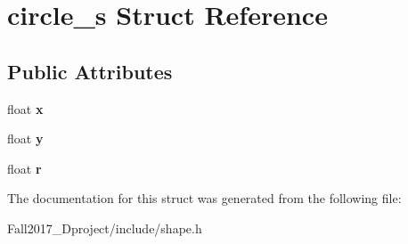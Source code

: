 \hypertarget{structcircle__s}{}\section{circle\+\_\+s Struct Reference}
\label{structcircle__s}
\subsection*{Public Attributes}
\begin{DoxyCompactItemize}
\item 
\mbox{\label{structcircle__s_ad3a5473841802c38bdca3a5c82e68cce}} 
float {\bfseries x}
\item 
\mbox{\label{structcircle__s_ad224ea98a61ffe074432260a36e47341}} 
float {\bfseries y}
\item 
\mbox{\label{structcircle__s_a0059cd1647a5f18484ac263f66305c27}} 
float {\bfseries r}
\end{DoxyCompactItemize}


The documentation for this struct was generated from the following file\+:\begin{DoxyCompactItemize}
\item 
Fall2017\+\_\+Dproject/include/shape.\+h\end{DoxyCompactItemize}
